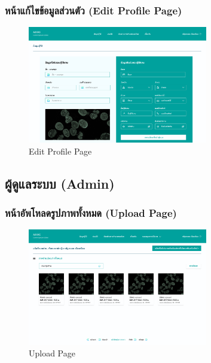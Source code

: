 \subsubsection{หน้าแก้ไขข้อมูลส่วนตัว (Edit Profile Page)}
\begin{figure}[h]
    \begin{center}
        \includegraphics[width=0.7\textwidth]{img/user/7-user-management-page.png}
    \end{center}
    \caption[Poem]{Edit Profile Page}
    \label{fig:edit_profile}
\end{figure}


\newpage
\subsection{ผู้ดูแลระบบ (Admin)}

\subsubsection{หน้าอัพโหลดรูปภาพทั้งหมด (Upload Page)}
\begin{figure}[h]
    \begin{center}
        \includegraphics[width=0.7\textwidth]{img/admin/1-admin-historyPage.png}
    \end{center}
    \caption[Poem]{Upload Page}
    \label{fig:admin_upload}
\end{figure}


